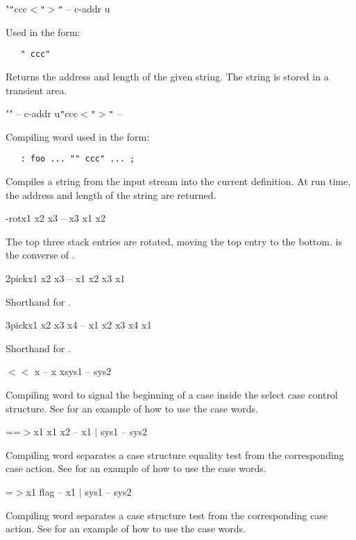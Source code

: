 \begin{gloss}{"}{\verb|"|ccc$<$\verb|"|$>$\verb|"| -- c-addr u}

Used in the form:
\begin{verbatim}
   " ccc"
\end{verbatim}
Returns the address and length of the given string.  The string is stored
in a transient area.
\end{gloss}
\begin{cgloss}{""}{ -- c-addr u}{\verb|"|ccc$<$\verb|"|$>$\verb|"| -- }

Compiling word used in the form:
\begin{verbatim}
   : foo ... "" ccc" ... ;
\end{verbatim}
Compiles a string from the input stream into the current definition.
At run time, the address and length of the string are returned.
\end{cgloss}
\begin{gloss}{-rot}{x1 x2 x3 -- x3 x1 x2}

The top three stack entries are rotated, moving the top entry to the
bottom.   is the converse of .
\end{gloss}
\begin{gloss}{2pick}{x1 x2 x3 -- x1 x2 x3 x1}

Shorthand for .
\end{gloss}
\begin{gloss}{3pick}{x1 x2 x3 x4 -- x1 x2 x3 x4 x1}

Shorthand for .
\end{gloss}
\begin{cgloss}{$<<$}{ x -- x x}{sys1 -- sys2}

Compiling word to signal the beginning of a case inside the select case
control structure.  See  for an example of how to use the case words.
\end{cgloss}
\begin{cgloss}{==$>$}{x1 x1 x2 -- x1 $|$ }{sys1 -- sys2}

Compiling word separates a case structure equality test from the corresponding
case action.  See  for an example of how to use the case words.
\end{cgloss}
\begin{cgloss}{=$>$}{x1 flag -- x1 $|$ }{sys1 -- sys2}

Compiling word separates a case structure test from the corresponding case
action.  See  for an example of how to use the case words.
\end{cgloss}
